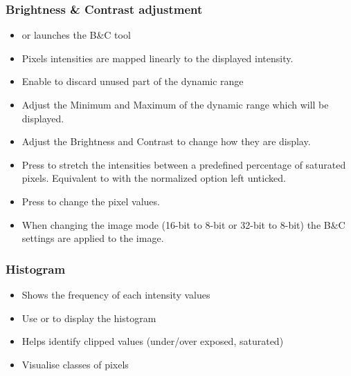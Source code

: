 \documentclass[ignorenonframetext,aspectratio=169,10pt,xcolor=table]{beamer}
\begin{document}
\begin{frame} \frametitle{Brightness \& Contrast adjustment}
  \begin{itemize}
  \item {} or
     launches the B\&C tool
  \item Pixels intensities are mapped linearly to the displayed
    intensity.
  \item Enable to discard unused part of the dynamic range
  \item Adjust the Minimum and Maximum of the dynamic range which will
    be displayed.
  \item Adjust the Brightness and Contrast to change how they are
    display.
  \item Press  to stretch the intensities between a
    predefined percentage of saturated pixels. Equivalent to  with the normalized option left unticked.
  \item Press  to change the pixel values.
  \item When changing the image mode (16-bit to 8-bit or 32-bit to
    8-bit) the B\&C settings are applied to the image.
  \end{itemize}
\end{frame}



\begin{frame} \frametitle{Histogram}
  \begin{itemize}
  \item Shows the frequency of each intensity values
  \item Use  or  to display the
    histogram
  \item Helps identify clipped values (under/over exposed, saturated)
  \item Visualise classes of pixels
  \end{itemize}
\end{frame}
\end{document}
